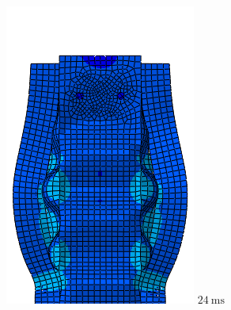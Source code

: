 \documentclass[
documentsize = a4, %
font = cmr, %
typesize = 11, %
printmode = true,
onehalfspacing = true,
language = en, %
titlepage = udciccp, %
degree = pt, %
dedication = true,
acknowledgements = true,
abstract-en = true,
abstract-es = false,
abstract-ga = false,
epigraphs = true,
toc = true,
lof = true,
lot = true,
frontmatterintoc = false,
notation = false,
minimal = false,
]{UDCthesis}
\begin{document}
\begin{figure}
\begin{minipage}[b]{.15\linewidth}
		\includegraphics[width=\linewidth]{IMG_CUTRES/c8}
		$\SI{24}{\ms}$
	\end{minipage}
	\quad
	\begin{minipage}[b]{.15\linewidth}
		\centering

\end{minipage}
\end{figure}
\end{document}
